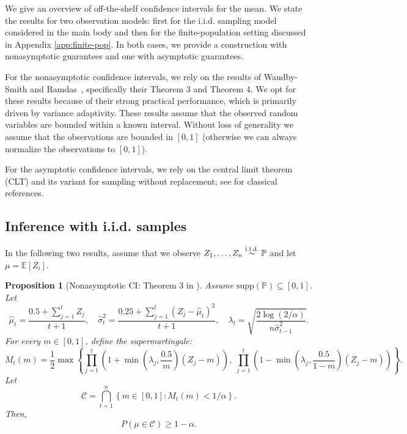 \documentclass[10pt]{article}
\newtheorem{prop}{Proposition}
\def\E{\mathbb{E}}
\newcommand{\C}{\mathcal{C}}
\renewcommand{\P}{\mathbb{P}}
\begin{document}
We give an overview of off-the-shelf confidence intervals for the mean. We state the results for two observation models: first for the i.i.d. sampling model considered in the main body and then for the finite-population setting discussed in Appendix \ref{app:finite-pop}. In both cases, we provide a construction with nonasymptotic guarantees and one with asymptotic guarantees.

For the nonasymptotic confidence intervals, we rely on the results of Waudby-Smith and Ramdas~\cite{waudby2020variance}, specifically their Theorem 3 and Theorem 4. We opt for these results because of their strong practical performance, which is primarily driven by variance adaptivity. These results assume that the observed random variables are bounded within a known interval. Without loss of generality we assume that the observations are bounded in $[0,1]$ (otherwise we can always normalize the observations to $[0,1]$).

For the asymptotic confidence intervals, we rely on the central limit theorem (CLT) and its variant for sampling without replacement; see \cite{erdos1959central,hoglund1978sampling} for classical references.

\subsection{Inference with i.i.d. samples}

In the following two results, assume that we observe $Z_1, \dots, Z_n
\stackrel{\rm i.i.d.}{\sim} \P$ and let $\mu = \E[Z_i]$.


\begin{prop}[Nonasymptotic CI: Theorem 3 in \cite{waudby2020variance}]
\label{prop:wsr-interval-iid}
Assume $\text{supp}(\P)\subseteq [0,1]$. Let
\begin{equation}
    \hat{\mu}_t = \frac{0.5 + \sum_{j=1}^t Z_{j}}{t+1},\quad \hat{\sigma}_t^2 = \frac{0.25 + \sum_{j=1}^t (Z_{j} - \hat{\mu}_t)^2}{t + 1}, \quad \lambda_t = \sqrt{\frac{2\log(2/\alpha)}{n\hat{\sigma}^2_{t-1}}}.
\end{equation}
For every $m\in[0,1]$, define the supermartingale:
\begin{equation}
    M_t(m) = \frac{1}{2} \max\left\{\prod\limits_{j=1}^t\left(1+\min\left(\lambda_j, \frac{0.5}{m}\right)(Z_{j} - m)\right), \;  \prod\limits_{j=1}^t\left(1-\min\left(\lambda_j, \frac{0.5}{1-m}\right)(Z_{j} - m)\right) \right\}.
\end{equation}
Let
\begin{equation}
    \C = \bigcap\limits_{t=1}^{n} \left\{ m \in [0,1] : M_t(m) < 1/\alpha \right\}.
\end{equation}
Then,
$$P\left( \mu \in \C \right) \geq 1-\alpha.$$
\end{prop}
\end{document}
